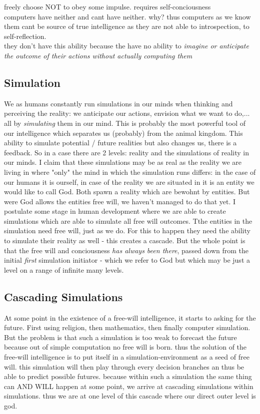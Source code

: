 freely choose NOT to obey some impulse. requires self-conciousness \\

computers have neither and cant have neither. why? thus computers as we know them cant be source of true intelligence as they are not able to introspection, to self-reflection. \\
they don't have this ability because the have no ability to \textit{imagine or anticipate the outcome of their actions without actually computing them}

\subsection{Simulation}
We as humans constantly run simulations in our minds when thinking and perceiving the reality: we anticipate our actions, envision what we want to do,... all by \textit{simulating} them in our mind. This is probably the most powerful tool of our intelligence which separates us (probably) from the animal kingdom. This ability to simulate potential / future realities but also changes us, there is a feedback.  So in a case there are 2 levels: reality and the simulations of reality in our minds.
I claim that these simulations may be as real as the reality we are living in where "only" the mind in which the simulation runs differs: in the case of our humans it is ourself, in case of the reality we are situated in it is an entity we would like to call God.
Both spawn a reality which are bewohnt by entities. But were God allows the entities free will, we haven't managed to do that yet. I postulate some stage in human development where we are able to create simulations which are able to simulate all free will outcomes. Tthe entities in the simulation need free will, just as we do. For this to happen they need the ability to simulate their reality as well - this creates a cascade. But the whole point is that the free will and conciousness \textit{has always been there}, passed down from the initial \textit{first} simulation initiator - which we refer to God but which may be just a level on a range of infinite many levels. 

\subsection{Cascading Simulations}
At some point in the existence of a free-will intelligence, it starts to asking for the future. First using religion, then mathematics, then finally computer simulation. But the problem is that such a simulation is too weak to forecast the future because out of simple computation no free will is born. thus the solution of the free-will intelligence is to put itself in a simulation-environment as a seed of free will. this simulation will then play through every decision branches an thus be able to predict possible futures. because within such a simulation the same thing can AND WILL happen at some point, we arrive at cascading simulations within simulations. thus we are at one level of this cascade where our direct outer level is god.

